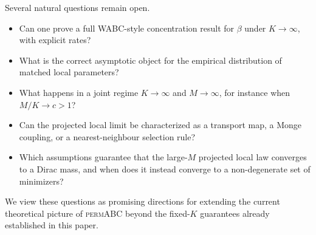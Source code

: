 Several natural questions remain open.
\begin{itemize}
  \item Can one prove a full WABC-style concentration result for $\beta$ under $K\to\infty$,
  with explicit rates?
  \item What is the correct asymptotic object for the empirical distribution of matched local
  parameters?
  \item What happens in a joint regime $K\to\infty$ and $M\to\infty$, for instance when
  $M/K \to c>1$?
  \item Can the projected local limit be characterized as a transport map, a Monge coupling, or
  a nearest-neighbour selection rule?
  \item Which assumptions guarantee that the large-$M$ projected local law converges to a Dirac
  mass, and when does it instead converge to a non-degenerate set of minimizers?
\end{itemize}

We view these questions as promising directions for extending the current theoretical picture of
\textsc{permABC} beyond the fixed-$K$ guarantees already established in this paper.
